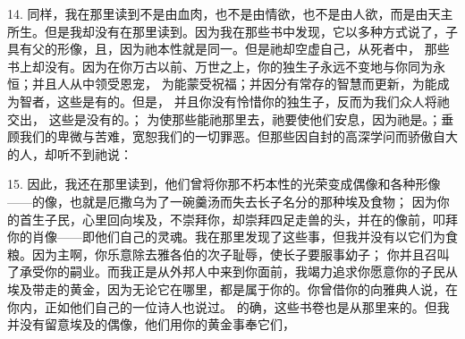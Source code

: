 14. 同样，我在那里读到不是由血肉，也不是由情欲，也不是由人欲，而是由天主所生。但是我却没有在那里读到。因为我在那些书中发现，它以多种方式说了，子具有父的形像，且，因为祂本性就是同一。但是祂却空虚自己，从死者中， 那些书上却没有。因为在你万古以前、万世之上，你的独生子永远不变地与你同为永恒；并且人从中领受恩宠， 为能蒙受祝福；并因分有常存的智慧而更新，为能成为智者，这些是有的。但是， 并且你没有怜惜你的独生子，反而为我们众人将祂交出， 这些是没有的。； 为使那些能祂那里去，祂要使他们安息，因为祂是。；垂顾我们的卑微与苦难，宽恕我们的一切罪恶。但那些因自封的高深学问而骄傲自大的人，却听不到祂说： \par

15. 因此，我还在那里读到，他们曾将你那不朽本性的光荣变成偶像和各种形像——的像，也就是厄撒乌为了一碗羹汤而失去长子名分的那种埃及食物； 因为你的首生子民，心里回向埃及，不崇拜你，却崇拜四足走兽的头，并在的像前，叩拜你的肖像——即他们自己的灵魂。我在那里发现了这些事，但我并没有以它们为食粮。因为主啊，你乐意除去雅各伯的次子耻辱，使长子要服事幼子； 你并且召叫了承受你的嗣业。而我正是从外邦人中来到你面前，我竭力追求你愿意你的子民从埃及带走的黄金，因为无论它在哪里，都是属于你的。你曾借你的向雅典人说，在你内，正如他们自己的一位诗人也说过。 的确，这些书卷也是从那里来的。但我并没有留意埃及的偶像，他们用你的黄金事奉它们， \par

